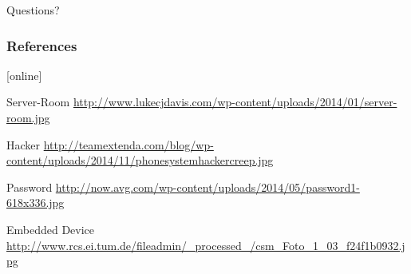 \documentclass{beamer}
\begin{document}
\begin{frame}
    \begin{center}Questions?\end{center}
\end{frame}

\appendix

\begin{frame}[allowframebreaks]
  \frametitle{References}
    
  \begin{thebibliography}{10}
    
 [online]

    Server-Room
    \newblock
    \url{http://www.lukecjdavis.com/wp-content/uploads/2014/01/server-room.jpg}
    
    Hacker
    \newblock
    \url{http://teamextenda.com/blog/wp-content/uploads/2014/11/phonesystemhackercreep.jpg}
    
    Password
    \newblock
    \url{http://now.avg.com/wp-content/uploads/2014/05/password1-618x336.jpg}
    
    Embedded Device
    \newblock
    \url{http://www.rcs.ei.tum.de/fileadmin/_processed_/csm_Foto_1_03_f24f1b0932.jpg}

  \end{thebibliography}
\end{frame}
\end{document}
